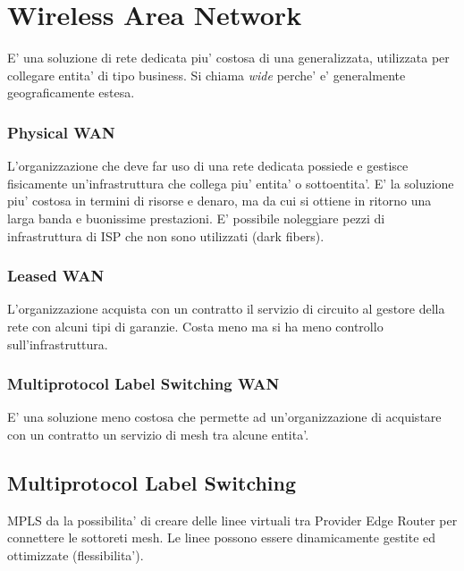 \chapter{Wireless Area Network}

E' una soluzione di rete dedicata piu' costosa di una generalizzata, utilizzata per collegare entita' di tipo business.
Si chiama \textit{wide} perche' e' generalmente geograficamente estesa.


\subsection{Physical WAN}

L'organizzazione che deve far uso di una rete dedicata possiede e gestisce fisicamente un'infrastruttura che collega piu' entita' o sottoentita'.
E' la soluzione piu' costosa in termini di risorse e denaro, ma da cui si ottiene in ritorno una larga banda e buonissime prestazioni.
E' possibile noleggiare pezzi di infrastruttura di ISP che non sono utilizzati (dark fibers).


\subsection{Leased WAN}

L'organizzazione acquista con un contratto il servizio di circuito al gestore della rete con alcuni tipi di garanzie.
Costa meno ma si ha meno controllo sull'infrastruttura.


\subsection{Multiprotocol Label Switching WAN}

E' una soluzione meno costosa che permette ad un'organizzazione di acquistare con un contratto un servizio di mesh tra alcune entita'.


\section{Multiprotocol Label Switching}

MPLS da la possibilita' di creare delle linee virtuali tra Provider Edge Router per connettere le sottoreti mesh.
Le linee possono essere dinamicamente gestite ed ottimizzate (flessibilita').

